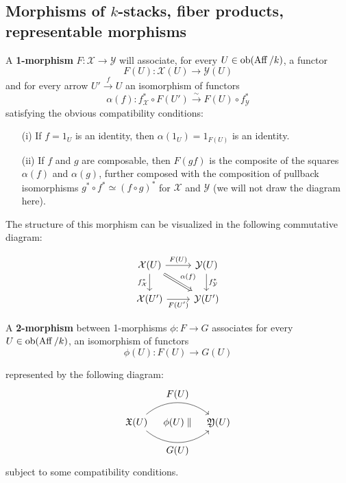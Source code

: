 \documentclass[12pt]{article}
\begin{document}
\subsection{Morphisms of $k$-stacks, fiber products, representable morphisms}
\begin{definition}
    A \textbf{1-morphism} \( F : \mathcal{X} \to \mathcal{Y} \) will associate, for every \( U \in \operatorname{ob}(\operatorname{Aff}/k) \), a functor
    \[
        F(U) : \mathcal{X}(U) \to \mathcal{Y}(U)
    \]
    and for every arrow \( U' \xrightarrow{f} U \) an isomorphism of functors
    \[
        \alpha(f) : f_{\mathcal{X}}^* \circ F(U') \xrightarrow{\sim} F(U) \circ f_{\mathcal{Y}}^*
    \]
    satisfying the obvious compatibility conditions:

    \begin{enumerate}
        \item[(i)] If \( f = 1_U \) is an identity, then \( \alpha(1_U) = 1_{F(U)} \) is an identity.
        \item[(ii)] If \( f \) and \( g \) are composable, then \( F(gf) \) is the composite of the squares \( \alpha(f) \) and \( \alpha(g) \), further composed with the composition of pullback isomorphisms \( g^* \circ f^* \simeq (f \circ g)^* \) for \( \mathcal{X} \) and \( \mathcal{Y} \) (we will not draw the diagram here).
    \end{enumerate}

    The structure of this morphism can be visualized in the following commutative diagram:

    \[
        \begin{tikzcd}
            \mathcal{X}(U) \arrow[r, "F(U)"]\arrow[rd, "\alpha(f)", Rightarrow]  \arrow[d, "f_{\mathcal{X}}^*"'] & \mathcal{Y}(U) \arrow[d, "f_{\mathcal{Y}}^*"] \\
            \mathcal{X}(U') \arrow[r, "F(U')"'] & \mathcal{Y}(U')
        \end{tikzcd}
    \]


    A \textbf{2-morphism} between 1-morphisms \( \phi : F \to G \) associates for every \( U \in \operatorname{ob}(\operatorname{Aff}/k) \), an isomorphism of functors
    \[
        \phi(U) : F(U) \to G(U)
    \]

    represented by the following diagram:
    \[
        \begin{tikzpicture}
            \node (X) at (0,0) {$\mathfrak{X}(U)$};
            \node (Y) at (3,0) {$\mathfrak{Y}(U)$};

            \draw[->] (X) to[bend left=40] node[above] {$F(U)$} (Y);

            \draw[->] (X) to[bend right=40] node[below] {$G(U)$} (Y);

            \node at (1.5,0) {$\phi(U)\parallel$};
        \end{tikzpicture}
    \]
    subject to some compatibility conditions.
\end{definition}
\end{document}
